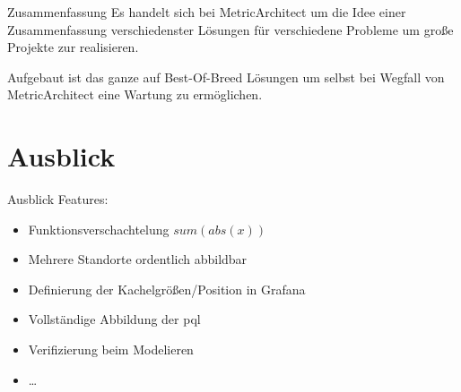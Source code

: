 \documentclass[12pt, pdf, xcolor={table, dvipsnames}, paperheight=8cm,paperwidth=12cm]{beamer}
\begin{document}
\begin{frame}{Zusammenfassung}
	Es handelt sich bei MetricArchitect um die Idee einer Zusammenfassung verschiedenster Lösungen für verschiedene Probleme um große Projekte zur realisieren.
	 
	\vspace{1em}
	Aufgebaut ist das ganze auf Best-Of-Breed Lösungen um selbst bei Wegfall von MetricArchitect eine Wartung zu ermöglichen.
	\begin{center}
	\end{center}
\end{frame}

\section{Ausblick}
\begin{frame}{Ausblick}
	Features:
	\begin{itemize}
		\item Funktionsverschachtelung $sum(abs(x))$
		\item Mehrere Standorte ordentlich abbildbar
		\item Definierung der Kachelgrößen/Position in Grafana
		\item Vollständige Abbildung der \gls{pql}
		\item Verifizierung beim Modelieren
		\item \dots
	\end{itemize}
\end{frame}



\end{document}
